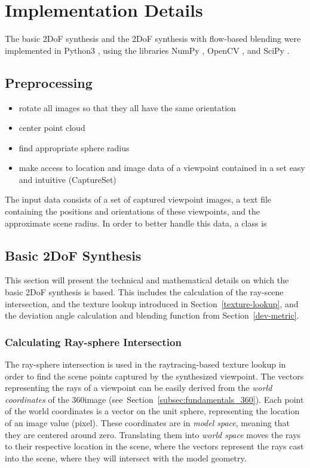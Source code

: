 \section{Implementation Details} \label{sec:impl_details}
The basic 2DoF synthesis and the 2DoF synthesis with flow-based blending were implemented in Python3 \cite{python}, using the libraries NumPy \cite{numpy}, OpenCV \cite{opencv}, and SciPy \cite{scipy}. 

\subsection{Preprocessing}
\begin{itemize}
  \item rotate all images so that they all have the same orientation
  \item center point cloud
  \item find appropriate sphere radius
  \item make access to location and image data of a viewpoint contained in a set easy and intuitive (CaptureSet)
\end{itemize}

The input data consists of a set of captured viewpoint images, a text file containing the positions and orientations of these viewpoints, and the approximate scene radius. In order to better handle this data, a class is 

\subsection{Basic 2DoF Synthesis}
This section will present the technical and mathematical details on which the basic 2DoF synthesis is based. This includes the calculation of the ray-scene intersection, and the texture lookup introduced in Section~\ref{texture-lookup}, and the deviation angle calculation and blending function from Section~\ref{dev-metric}.

\subsubsection{Calculating Ray-sphere Intersection}
The ray-sphere intersection is used in the raytracing-based texture lookup in order to find the scene points captured by the synthesized viewpoint. The vectors representing the rays of a viewpoint can be easily derived from the \emph{world coordinates} of the 360\degree image (see~Section~\ref{subsec:fundamentals_360}). Each point of the world coordinates is a vector on the unit sphere, representing the location of an image value (pixel). These coordinates are in \emph{model space}, meaning that they are centered around zero. Translating them into \emph{world space} moves the rays to their respective location in the scene, where the vectors represent the rays cast into the scene, where they will intersect with the model geometry.

